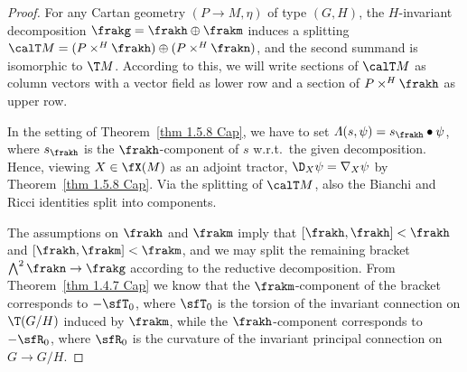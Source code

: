 \begin{proof}
    For any Cartan geometry $(P\to M,\eta)$ of type $(G,H)$, the $H$-invariant decomposition $\frakg=\frakh\oplus\frakm$ induces a splitting $\calT M=(P\times^H\frakh)\oplus(P\times^H \frakn)$, and the second summand is isomorphic to $\T M$. According to this, we will write sections of $\calT M$ as column vectors with a vector field as lower row and a section of $P\times^H \frakh$ as upper row.

    In the setting of Theorem~\ref{thm 1.5.8 Cap}, we have to set $\varLambda(s,\psi)=s_\frakh\bullet \psi$, where $s_\frakh$ is the $\frakh$-component of $s$ w.r.t.\ the given decomposition. Hence, viewing $X\in\fX(M)$ as an adjoint tractor, $\D_X \psi=\nabla_X\psi$ by Theorem~\ref{thm 1.5.8 Cap}. Via the splitting of $\calT M$, also the Bianchi and Ricci identities split into components. 

    The assumptions on $\frakh$ and $\frakm$ imply that $[\frakh,\frakh]<\frakh$ and $[\frakh,\frakm]<\frakm$, and we may split the remaining bracket $\bigwedge^2\frakn\to \frakg$ according to the reductive decomposition. From Theorem~\ref{thm 1.4.7 Cap} we know that the $\frakm$-component of the bracket corresponds to $-\sfT_0$, where $\sfT_0$ is the torsion of the invariant connection on $\T(G\slash H)$ induced by $\frakm$, while the $\frakh$-component corresponds to $-\sfR_0$, where $\sfR_0$ is the curvature of the invariant principal connection on $G\to G\slash H$.


\end{proof}
